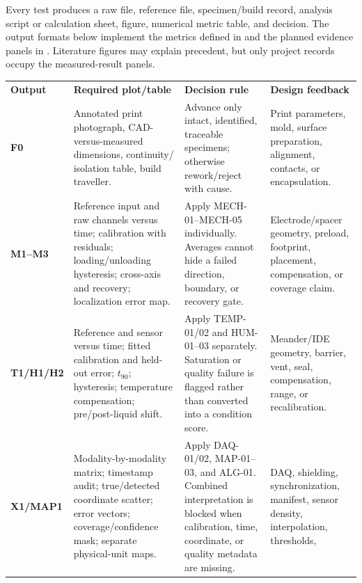 {\fontsize{9.0}{10.6}\selectfont
Every test produces a raw file, reference file, specimen/build record, analysis
script or calculation sheet, figure, numerical metric table, and decision.
The output formats below implement the metrics defined in
 and the planned evidence panels in
. Literature figures may
explain precedent, but only project records occupy the measured-result panels.\par}

\begingroup
\fontsize{7.55}{8.85}\selectfont
\setlength{\tabcolsep}{2.55pt}\renewcommand{\arraystretch}{1.04}
\begin{tabularx}{\linewidth}{>{\raggedright\arraybackslash\bfseries\color{AUBRed}}p{1.05cm}Y Y Y}
\color{white}\textbf{Output} & \color{white}\textbf{Required plot/table} &
\color{white}\textbf{Decision rule} & \color{white}\textbf{Design feedback} \\
F0 & Annotated print photograph, CAD-versus-measured dimensions, continuity/
isolation table, build traveller. & Advance only intact, identified, traceable
specimens; otherwise rework/reject with cause. & Print parameters, mold,
surface preparation, alignment, contacts, or encapsulation. \\
M1--M3 & Reference input and raw channels versus time; calibration with
residuals; loading/unloading hysteresis; cross-axis and recovery; localization
error map. & Apply MECH-01--MECH-05 individually. Averages cannot hide a
failed direction, boundary, or recovery gate. & Electrode/spacer geometry,
preload, footprint, placement, compensation, or coverage claim. \\
T1/H1/H2 & Reference and sensor versus time; fitted calibration and held-out
error; $t_{90}$; hysteresis; temperature compensation; pre/post-liquid shift.
& Apply TEMP-01/02 and HUM-01--03 separately. Saturation or quality failure is
flagged rather than converted into a condition score. & Meander/IDE geometry,
barrier, vent, seal, compensation, range, or recalibration. \\
X1/MAP1 & Modality-by-modality matrix; timestamp audit; true/detected coordinate
scatter; error vectors; coverage/confidence mask; separate physical-unit maps.
& Apply DAQ-01/02, MAP-01--03, and ALG-01. Combined interpretation is blocked
when calibration, time, coordinate, or quality metadata are missing. & DAQ,
shielding, synchronization, manifest, sensor density, interpolation, thresholds,

\end{tabularx}
